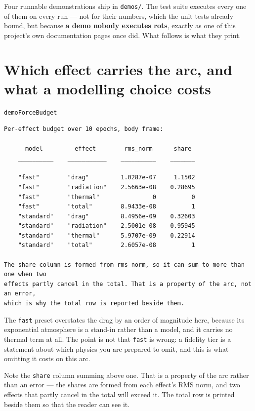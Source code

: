 \documentclass[11pt,a4paper]{report}
\begin{document}
Four runnable demonstrations ship in \texttt{demos/}. The test suite executes every one of them on
every run --- not for their numbers, which the unit tests already bound, but because \textbf{a demo
nobody executes rots}, exactly as one of this project's own documentation pages once did. What
follows is what they print.

\section{Which effect carries the arc, and what a modelling choice costs}
\begin{lstlisting}
demoForceBudget
\end{lstlisting}
\begin{lstlisting}
Per-effect budget over 10 epochs, body frame:

      model         effect        rms_norm      share
    __________    ___________    __________    _______

    "fast"        "drag"         1.0287e-07     1.1502
    "fast"        "radiation"    2.5663e-08    0.28695
    "fast"        "thermal"               0          0
    "fast"        "total"        8.9433e-08          1
    "standard"    "drag"         8.4956e-09    0.32603
    "standard"    "radiation"    2.5001e-08    0.95945
    "standard"    "thermal"      5.9707e-09    0.22914
    "standard"    "total"        2.6057e-08          1

The share column is formed from rms_norm, so it can sum to more than one when two
effects partly cancel in the total. That is a property of the arc, not an error,
which is why the total row is reported beside them.
\end{lstlisting}

\noindent The \texttt{fast} preset overstates the drag by an order of magnitude here, because its
exponential atmosphere is a stand-in rather than a model, and it carries no thermal term at all. The
point is not that \texttt{fast} is wrong: a fidelity tier is a statement about which physics you are
prepared to omit, and this is what omitting it costs on this arc.

Note the \texttt{share} column summing above one. That is a property of the arc rather than an
error --- the shares are formed from each effect's RMS norm, and two effects that partly cancel in
the total will exceed it. The total row is printed beside them so that the reader can see it.
\end{document}
